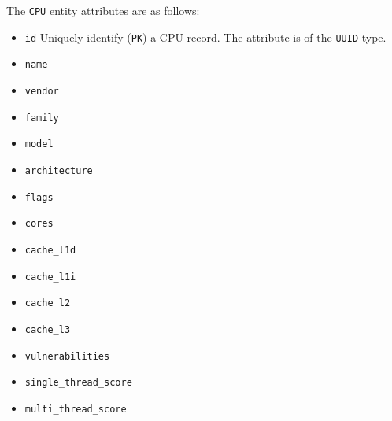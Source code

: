 The \texttt{CPU} entity attributes are as follows:

\begin{itemize}
  \item \texttt{id}
    \newline
    Uniquely identify (\texttt{PK}) a CPU record.
    \newline
    The attribute is of the \texttt{UUID} type.

  \item \texttt{name}
    \newline

  \item \texttt{vendor}
    \newline

  \item \texttt{family}
    \newline

  \item \texttt{model}
    \newline

  \item \texttt{architecture}
    \newline

  \item \texttt{flags}
    \newline

  \item \texttt{cores}
    \newline

  \item \texttt{cache\_l1d}
    \newline

  \item \texttt{cache\_l1i}
    \newline

  \item \texttt{cache\_l2}
    \newline

  \item \texttt{cache\_l3}
    \newline

  \item \texttt{vulnerabilities}
    \newline

  \item \texttt{single\_thread\_score}
    \newline

  \item \texttt{multi\_thread\_score}
    \newline


\end{itemize}
